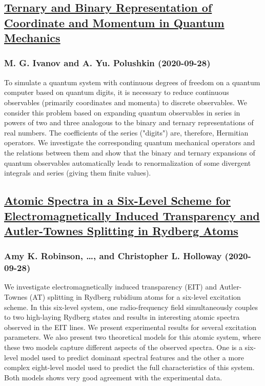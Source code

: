 \subsection*{\href{http://arxiv.org/abs/2009.13618v1}{Ternary and Binary Representation of Coordinate and Momentum in Quantum  Mechanics}}
\subsubsection*{M. G. Ivanov and A. Yu. Polushkin (2020-09-28)}
To simulate a quantum system with continuous degrees of freedom on a quantum
computer based on quantum digits, it is necessary to reduce continuous
observables (primarily coordinates and momenta) to discrete observables. We
consider this problem based on expanding quantum observables in series in
powers of two and three analogous to the binary and ternary representations of
real numbers. The coefficients of the series ("digits") are, therefore,
Hermitian operators. We investigate the corresponding quantum mechanical
operators and the relations between them and show that the binary and ternary
expansions of quantum observables automatically leads to renormalization of
some divergent integrals and series (giving them finite values).

\subsection*{\href{http://arxiv.org/abs/2009.13612v1}{Atomic Spectra in a Six-Level Scheme for Electromagnetically Induced  Transparency and Autler-Townes Splitting in Rydberg Atoms}}
\subsubsection*{Amy K. Robinson, \dots, and Christopher L. Holloway (2020-09-28)}
We investigate electromagnetically induced transparency (EIT) and
Autler-Townes (AT) splitting in Rydberg rubidium atoms for a six-level
excitation scheme. In this six-level system, one radio-frequency field
simultaneously couples to two high-laying Rydberg states and results in
interesting atomic spectra observed in the EIT lines. We present experimental
results for several excitation parameters. We also present two theoretical
models for this atomic system, where these two models capture different aspects
of the observed spectra. One is a six-level model used to predict dominant
spectral features and the other a more complex eight-level model used to
predict the full characteristics of this system. Both models shows very good
agreement with the experimental data.

